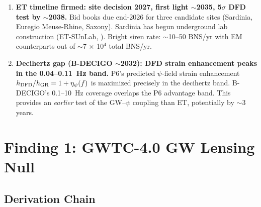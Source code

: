 \documentclass[11pt]{article}
\begin{document}
\begin{tcolorbox}[colback=green!5!white, colframe=green!70!black,
  title=\textbf{W4i19: FIVE NEW FINDINGS, TWO UPGRADES}]
\begin{enumerate}
\item \textbf{ET timeline firmed: site decision 2027, first light $\sim$2035,
  5$\sigma$ DFD test by $\sim$2038.} Bid books due end-2026 for three
  candidate sites (Sardinia, Euregio Meuse-Rhine, Saxony). Sardinia
  has begun underground lab construction (ET-SUnLab, ). Bright
  siren rate: $\sim$10--50 BNS/yr with EM counterparts out of
  $\sim$7 $\times$ 10$^4$ total BNS/yr.

\item \textbf{Decihertz gap (B-DECIGO $\sim$2032): DFD strain enhancement
  peaks in the 0.04--0.11~Hz band.} P6's predicted $\psi$-field strain
  enhancement $h_{\rm DFD}/h_{\rm GR} = 1 + \eta_\psi(f)$ is maximized
  precisely in the decihertz band. B-DECIGO's 0.1--10~Hz coverage overlaps
  the P6 advantage band. This provides an \emph{earlier} test of the
  GW--$\psi$ coupling than ET, potentially by $\sim$3 years.
\end{enumerate}

\end{tcolorbox}

\section{Finding 1: GWTC-4.0 GW Lensing Null}
\label{sec:lensing}

\subsection{Derivation Chain}
\end{document}
